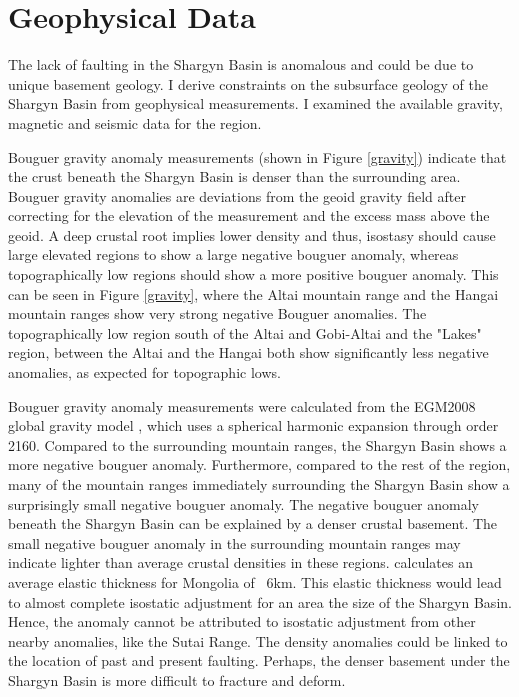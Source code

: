 \section{Geophysical Data}
	The lack of faulting in the Shargyn Basin is anomalous and could be due to unique basement geology. I derive constraints on the subsurface geology of the Shargyn Basin from geophysical measurements. I examined the available gravity, magnetic and seismic data for the region.

	Bouguer gravity anomaly measurements (shown in Figure \ref{gravity}) indicate that the crust beneath the Shargyn Basin is denser than the surrounding area. Bouguer gravity anomalies are deviations from the geoid gravity field after correcting for the elevation of the measurement and the excess mass above the geoid. A deep crustal root implies lower density and thus, isostasy should cause large elevated regions to show a large negative bouguer anomaly, whereas topographically low regions should show a more positive bouguer anomaly. This can be seen in Figure \ref{gravity}, where the Altai mountain range and the Hangai mountain ranges show very strong negative Bouguer anomalies. The topographically low region south of the Altai and Gobi-Altai and the "Lakes" region, between the Altai and the Hangai both show significantly less negative anomalies, as expected for topographic lows.
	
	Bouguer gravity anomaly measurements were calculated from the EGM2008 global gravity model \citep{EGM2008}, which uses a spherical harmonic expansion through order 2160. Compared to the surrounding mountain ranges, the Shargyn Basin shows a more negative bouguer anomaly. Furthermore, compared to the rest of the region, many of the mountain ranges immediately surrounding the Shargyn Basin show a surprisingly small negative bouguer anomaly. The negative bouguer anomaly beneath the Shargyn Basin can be explained by a denser crustal basement. The small negative bouguer anomaly in the surrounding mountain ranges may indicate lighter than average crustal densities in these regions. \citet{Bayasgalan2005a} calculates an average elastic thickness for Mongolia of ~6km. This elastic thickness would lead to almost complete isostatic adjustment for an area the size of the Shargyn Basin. Hence, the anomaly cannot be attributed to isostatic adjustment from other nearby anomalies, like the Sutai Range. The density anomalies could be linked to the location of past and present faulting. Perhaps, the denser basement under the Shargyn Basin is more difficult to fracture and deform.

